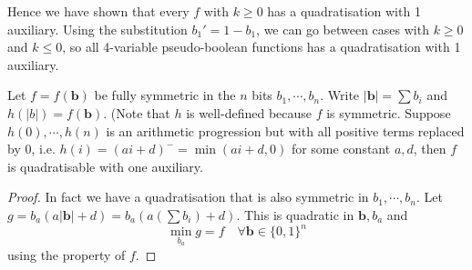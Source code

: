 \documentclass[11pt]{scrartcl}
\newcommand{\vc}[1]{\boldsymbol{#1}}
\begin{document}
Hence we have shown that every $f$ with $k\ge 0$ has a quadratisation with 1 auxiliary. Using the substitution $b_1'=1-b_1$,
we can go between cases with $k \ge 0$ and $k \le 0$, so all 4-variable pseudo-boolean functions has a quadratisation with 1 auxiliary.

\begin{theorem}
Let $f = f(\vc b)$ be fully symmetric in the $n$ bits $b_1, \cdots, b_n$. Write $|\vc b|=\sum b_i$ and $h(|b|) = f(\vc b)$. (Note that $h$ 
is well-defined because $f$ is symmetric. Suppose $h(0), \cdots, h(n)$ is an arithmetic progression but with all positive terms replaced by 0, 
i.e. $h(i) = (ai+d)^- = \min(ai+d, 0)$ for some constant $a, d$, then $f$ is quadratisable with one auxiliary.  
\end{theorem}

\begin{proof}
	In fact we have a quadratisation that is also symmetric in $b_1, \cdots, b_n$.
	Let $g = b_a(a|\vc b| + d) = b_a (a(\sum b_i) + d)$. This is quadratic in $\vc b, b_a$ and 
	\[\min_{b_a} g = f \quad \forall \vc b \in \{0, 1\}^n\]
	using the property of $f$.
\end{proof}
\end{document}
